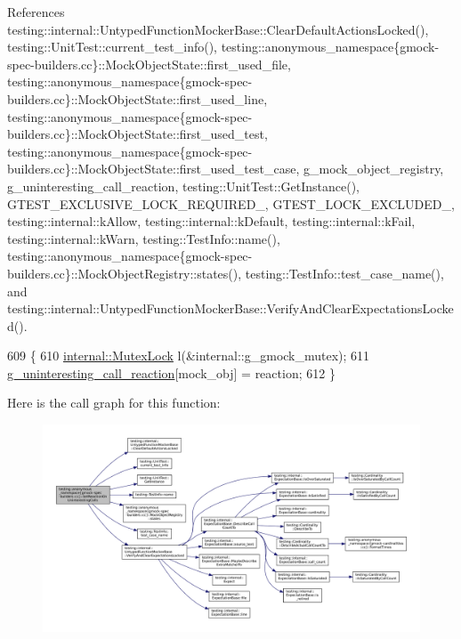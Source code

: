 References testing\+::internal\+::\+Untyped\+Function\+Mocker\+Base\+::\+Clear\+Default\+Actions\+Locked(), testing\+::\+Unit\+Test\+::current\+\_\+test\+\_\+info(), testing\+::anonymous\+\_\+namespace\{gmock-\/spec-\/builders.\+cc\}\+::\+Mock\+Object\+State\+::first\+\_\+used\+\_\+file, testing\+::anonymous\+\_\+namespace\{gmock-\/spec-\/builders.\+cc\}\+::\+Mock\+Object\+State\+::first\+\_\+used\+\_\+line, testing\+::anonymous\+\_\+namespace\{gmock-\/spec-\/builders.\+cc\}\+::\+Mock\+Object\+State\+::first\+\_\+used\+\_\+test, testing\+::anonymous\+\_\+namespace\{gmock-\/spec-\/builders.\+cc\}\+::\+Mock\+Object\+State\+::first\+\_\+used\+\_\+test\+\_\+case, g\+\_\+mock\+\_\+object\+\_\+registry, g\+\_\+uninteresting\+\_\+call\+\_\+reaction, testing\+::\+Unit\+Test\+::\+Get\+Instance(), G\+T\+E\+S\+T\+\_\+\+E\+X\+C\+L\+U\+S\+I\+V\+E\+\_\+\+L\+O\+C\+K\+\_\+\+R\+E\+Q\+U\+I\+R\+E\+D\+\_\+, G\+T\+E\+S\+T\+\_\+\+L\+O\+C\+K\+\_\+\+E\+X\+C\+L\+U\+D\+E\+D\+\_\+, testing\+::internal\+::k\+Allow, testing\+::internal\+::k\+Default, testing\+::internal\+::k\+Fail, testing\+::internal\+::k\+Warn, testing\+::\+Test\+Info\+::name(), testing\+::anonymous\+\_\+namespace\{gmock-\/spec-\/builders.\+cc\}\+::\+Mock\+Object\+Registry\+::states(), testing\+::\+Test\+Info\+::test\+\_\+case\+\_\+name(), and testing\+::internal\+::\+Untyped\+Function\+Mocker\+Base\+::\+Verify\+And\+Clear\+Expectations\+Locked().


\begin{DoxyCode}
609                                                 \{
610   \hyperlink{namespacetesting_1_1internal_a08b187c6cc4e28400aadf9a32fccc8de}{internal::MutexLock} l(&internal::g\_gmock\_mutex);
611   \hyperlink{namespacetesting_1_1anonymous__namespace_02gmock-spec-builders_8cc_03_ab456ef4b8025f61463aa08ba4098dceb}{g\_uninteresting\_call\_reaction}[mock\_obj] = reaction;
612 \}
\end{DoxyCode}
Here is the call graph for this function\+:
\nopagebreak
\begin{figure}[H]
\begin{center}
\leavevmode
\includegraphics[width=350pt]{namespacetesting_1_1anonymous__namespace_02gmock-spec-builders_8cc_03_a4b6c5727bdd640c48b03da3a39b66f8e_cgraph}
\end{center}
\end{figure}


